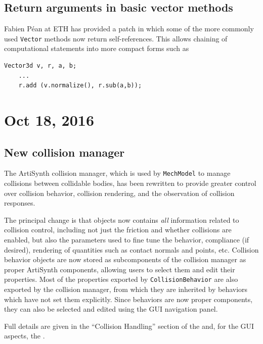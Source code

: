 \documentclass{article}
\begin{document}
\subsection*{Return arguments in basic vector methods}

Fabien P\'{e}an at ETH has provided a patch in which some of the more
commonly used {\tt Vector} methods now return self-references.  This
allows chaining of computational statements into more compact forms
such as

%
\begin{lstlisting}[]
    Vector3d v, r, a, b;
    ...
    r.add (v.normalize(), r.sub(a,b));
\end{lstlisting}
%

\section*{Oct 18, 2016}

\subsection*{New collision manager}

The ArtiSynth collision manager, which is used by {\tt MechModel} to
manage collisions between collidable bodies, has been rewritten to
provide greater control over collision behavior, collision rendering,
and the observation of collision responses. 

The principal change is that
 objects now
contains {\it all} information related to collision control, including
not just the friction and whether collisions are enabled, but also the
parameters used to fine tune the behavior, compliance (if desired),
rendering of quantities such as contact normals and points,
etc. Collision behavior objects are now stored as subcomponents of
the collision manager as proper ArtiSynth components, allowing users
to select them and edit their properties. Most of the properties
exported by {\tt CollisionBehavior} are also exported by the collision
manager, from which they are inherited by behaviors which have not set
them explicitly. Since behaviors are now proper components, they can
also be selected and edited using the GUI navigation panel.

Full details are given in the ``Collision Handling'' section of the
and, for the GUI aspects, the
.
\end{document}

